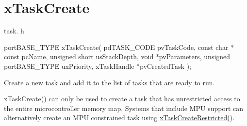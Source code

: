 \hypertarget{group__xTaskCreate}{}\section{x\+Task\+Create}
\label{group__xTaskCreate}
task. h 
\begin{DoxyPre}
portBASE\_TYPE xTaskCreate(
                          pdTASK\_CODE pvTaskCode,
                          const char * const pcName,
                          unsigned short usStackDepth,
                          void *pvParameters,
                          unsigned portBASE\_TYPE uxPriority,
                          xTaskHandle *pvCreatedTask
                      );\end{DoxyPre}


Create a new task and add it to the list of tasks that are ready to run.

\hyperlink{task_8h_adf67e7cd0bfd1eda9e8afd048206f7c2}{x\+Task\+Create()} can only be used to create a task that has unrestricted access to the entire microcontroller memory map. Systems that include M\+PU support can alternatively create an M\+PU constrained task using \hyperlink{task_8h_a61b00cd623953f4f94fe794057d7f648}{x\+Task\+Create\+Restricted()}.


